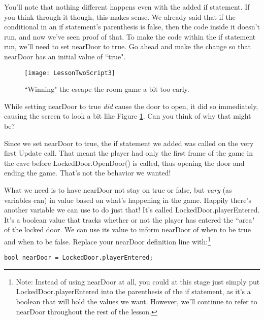 \documentclass{article}
\begin{document}
\noindent{}
	
You'll note that nothing different happens even with the added if statement. If you think through it though, this makes sense. We already said that if the conditional in an if statement's parenthesis is false, then the code inside it doesn't run, and now we've seen proof of that. To make the code within the if statement run, we'll need to set nearDoor to true. Go ahead and make the change so that nearDoor has an initial value of ``true".

\noindent{}

\begin{figure}
  \texttt{[image: LessonTwoScript3]}
  \caption{``Winning" the escape the room game a bit too early.}
  \label{fig:LessonTwoScript3}
\end{figure}

While setting nearDoor to true \textit{did} cause the door to open, it did so immediately, causing the screen to look a bit like Figure \ref{fig:LessonTwoScript3}. Can you think of why that might be? 

Since we set nearDoor to true, the if statement we added was called on the very first Update call. That meant the player had only the first frame of the game in the cave before LockedDoor.OpenDoor() is called, thus opening the door and ending the game. That's not the behavior we wanted!

What we need is to have nearDoor not stay on true or false, but \textit{vary} (as variables can) in value based on what's happening in the game. Happily there's another variable we can use to do just that! It's called LockedDoor.playerEntered. It's a boolean value that tracks whether or not the player has entered the ``area" of the locked door. We can use its value to inform nearDoor of when to be true and when to be false. Replace your nearDoor definition line with:\footnote{Note: Instead of using nearDoor at all, you could at this stage just simply put LockedDoor.playerEntered into the parenthesis of the if statement, as it's a boolean that will hold the values we want. However, we'll continue to refer to nearDoor throughout the rest of the lesson.}

\lstset{style=sharpc}
\begin{lstlisting}
bool nearDoor = LockedDoor.playerEntered;
\end{lstlisting}
\end{document}
